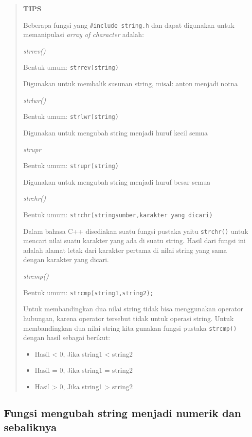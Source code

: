 \begin{quotation}
{\LARGE {}} \textbf{TIPS}

Beberapa fungsi yang \texttt{\#include\ string.h} dan dapat digunakan
untuk memanipulasi \emph{array of character} adalah:

\emph{strrev()}

Bentuk umum: \texttt{strrev(string)}

Digunakan untuk membalik susunan string, misal: anton menjadi notna

\emph{strlwr()}

Bentuk umum: \texttt{strlwr(string)}

Digunakan untuk mengubah string menjadi huruf kecil semua

\emph{strupr}

Bentuk umum: \texttt{strupr(string)}

Digunakan untuk mengubah string menjadi huruf besar semua

\emph{strchr()}

Bentuk umum: \texttt{strchr(stringsumber,karakter\ yang\ dicari)}

Dalam bahasa C++ disediakan suatu fungsi pustaka yaitu \texttt{strchr()}
untuk mencari nilai suatu karakter yang ada di suatu string. Hasil dari
fungsi ini adalah alamat letak dari karakter pertama di nilai string
yang sama dengan karakter yang dicari.

\emph{strcmp()}

Bentuk umum: \texttt{strcmp(string1,string2);}

Untuk membandingkan dua nilai string tidak bisa menggunakan operator
hubungan, karena operator tersebut tidak untuk operasi string. Untuk
membandingkan dua nilai string kita gunakan fungsi pustaka
\texttt{strcmp()} dengan hasil sebagai berikut:

\begin{itemize}

\item
Hasil \textless{} 0, Jika string1 \textless{} string2
\item
Hasil = 0, Jika string1 = string2
\item
Hasil \textgreater{} 0, Jika string1 \textgreater{} string2
\end{itemize}
\end{quotation}


\subsection{Fungsi mengubah string menjadi numerik dan sebaliknya}\label{fungsi-mengubah-string-menjadi-numerik-dan-sebaliknya}

